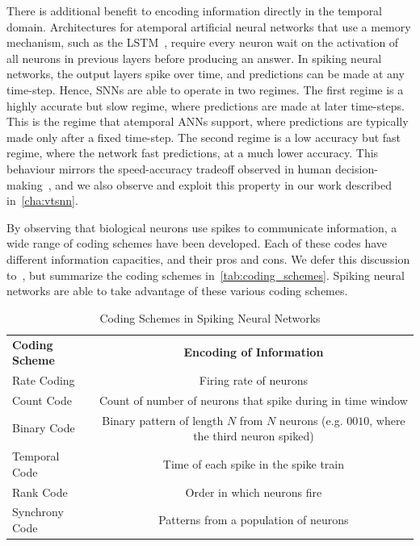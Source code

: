 \documentclass[fyp]{socreport}
\begin{document}
There is additional benefit to encoding information directly in the temporal
domain. Architectures for atemporal artificial neural networks that use a memory
mechanism, such as the LSTM~\cite{hochreiter1997long}, require every neuron wait
on the activation of all neurons in previous layers before producing an answer.
In spiking neural networks, the output layers spike over time, and predictions
can be made at any time-step. Hence, SNNs are able to operate in two regimes.
The first regime is a highly accurate but slow regime, where predictions are
made at later time-steps. This is the regime that atemporal ANNs support, where
predictions are typically made only after a fixed time-step. The second regime
is a low accuracy but fast regime, where the network fast predictions, at a much
lower accuracy. This behaviour mirrors the speed-accuracy tradeoff observed in
human decision-making~\cite{comsa19_tempor_codin_spikin_neural_networ}, and we
also observe and exploit this property in our work described
in~\autoref{cha:vtsnn}.

By observing that biological neurons use spikes to communicate information, a
wide range of coding schemes have been developed. Each of these codes have
different information capacities, and their pros and cons. We defer this
discussion to~\cite{thorpe2001spike}, but summarize the coding schemes
in~\autoref{tab:coding_schemes}. Spiking neural networks are able to take
advantage of these various coding schemes.

\begin{table}
  \centering
  \small
  \begin{tabular}{l|c}
    \hline
    \hline
    \textbf{Coding Scheme} & \textbf{Encoding of Information} \\
    Rate Coding & Firing rate of neurons \\
    Count Code & Count of number of neurons that spike during in time window \\
    Binary Code & Binary pattern of length $N$ from $N$ neurons (e.g. $0010$,
                  where the third neuron spiked) \\
    Temporal Code & Time of each spike in the spike
                    train \\
    Rank Code & Order in which neurons fire \\
    Synchrony Code & Patterns from a population of neurons \\
    \hline
    \hline
  \end{tabular}
  \normalsize
  \caption{Coding Schemes in Spiking Neural Networks}
  \label{tab:coding_schemes}
\end{table}
\end{document}
